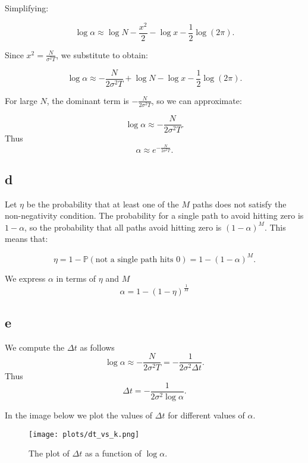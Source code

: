 \documentclass[a4paper,12pt]{article} %
\begin{document}
Simplifying:

\[
    \log \alpha \approx \log N - \frac{x^2}{2} - \log x - \frac{1}{2} \log(2\pi).
\]

Since $x^2 = \frac{N}{\sigma^2 T}$, we substitute to obtain:

\[
    \log \alpha \approx -\frac{N}{2 \sigma^2 T} + \log N - \log x - \frac{1}{2} \log(2\pi).
\]

For large $N$, the dominant term is $-\frac{N}{2 \sigma^2 T}$, so we can approximate:

\[
    \log \alpha \approx -\frac{N}{2 \sigma^2 T}.
\]
Thus
\begin{equation}
    \alpha \approx e^{-\frac{N}{2 \sigma^2 T}}.
\end{equation}
\subsection{d}
Let $\eta$ be the probability that at least one of the $M$ paths does not satisfy the non-negativity condition. The probability for a single path to avoid hitting zero is $1 - \alpha$, so the probability that all paths avoid hitting zero is $(1 - \alpha)^M$. This means that:

$$\eta = 1 - \mathbb{P}(\text{not a single path hits 0}) = 1 - (1 - \alpha)^M.$$

We express $\alpha$ in terms of $\eta$ and $M$
$$
    \alpha= 1-(1-\eta)^\frac{1}{M}
$$



\subsection{e}
We compute the \(\Delta  t \) as follows
\begin{equation}
    \log  \alpha  \approx -\frac{N}{2 \sigma ^2 T} = - \frac{1}{2 \sigma ^2 \Delta  t} .
\end{equation}
Thus
\begin{equation}
    \Delta t = -\frac{1}{2 \sigma ^2 \log \alpha}.
\end{equation}


In the image below we plot the values of \( \Delta  t\) for different values of \(\alpha\).
\begin{figure}[H]
    \centering
    \texttt{[image: plots/dt\_vs\_k.png]} %
    \caption{The plot of $\Delta t$ as a function of $\log \alpha$.}
\end{figure}
\end{document}
